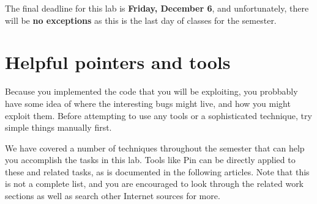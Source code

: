 \documentclass[11pt]{article}
\begin{document}
The final deadline for this lab is \textbf{Friday, December 6}, and unfortunately, there will be \textbf{no exceptions} as this is the last day of classes for the semester. 

\newpage
\section{Helpful pointers and tools}
\label{sect:help}

Because you implemented the code that you will be exploiting, you probbably have some idea of where the interesting bugs might live, and how you might exploit them. Before attempting to use any tools or a sophisticated technique, try simple things manually first.

We have covered a number of techniques throughout the semester that can help you accomplish the tasks in this lab. Tools like Pin can be directly applied to these and related tasks, as is documented in the following articles. Note that this is not a complete list, and you are encouraged to look through the related work sections as well as search other Internet sources for more.
\end{document}
